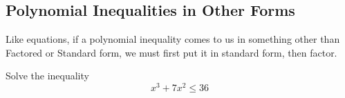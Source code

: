 \subsection{Polynomial Inequalities in Other Forms} 
Like equations, if a polynomial inequality comes to us in something other than Factored or Standard form, we must first put it in standard form, then factor.
\begin{Example}
Solve the inequality
\[
x^3+7x^2 \leq 36
\]
\fillpaper
\end{Example}